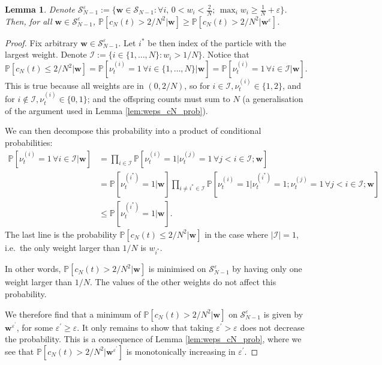 \documentclass{article}
\newtheorem{lemma}{Lemma}
\newcommand{\PR}{\mathbb{P}}
\begin{document}
\begin{lemma}
Denote $\mathcal{S}_{N-1}^\varepsilon := \{ \mathbf{w} \in \mathcal{S}_{N-1} :  \forall i, \, 0 <w_i <\frac{2}{N} ;\, \max_i w_i \geq \frac{1}{N} + \varepsilon \}$.
Then, for all $\mathbf{w} \in \mathcal{S}_{N-1}^\varepsilon$, 
$\PR[c_N(t) > 2/N^2 | \mathbf{w} ] \geq \PR[c_N(t) > 2/N^2 | \mathbf{w}^\varepsilon ]$.
\end{lemma}

\begin{proof}
Fix arbitrary $\mathbf{w} \in \mathcal{S}_{N-1}^\varepsilon$. Let $i^*$ be then index of the particle with the largest weight.
Denote $\mathcal{I} := \{i \in \{1,\dots,N\} : w_i > 1/N \}$.
Notice that 
\begin{equation*}
\PR[ c_N(t) \leq 2/N^2 | \mathbf{w} ] 
= \PR[ \nu_t^{(i)} =1 \,\forall i\in\{1,\dots,N\} | \mathbf{w}] 
= \PR[ \nu_t^{(i)} =1 \,\forall i\in \mathcal{I} | \mathbf{w}] .
\end{equation*}
This is true because all weights are in $(0, 2/N)$, so for $i \in \mathcal{I}, \nu_t^{(i)} \in \{1,2\}$, and for $i \notin \mathcal{I}, \nu_t^{(i)} \in \{0,1\}$; and the offspring counts must sum to $N$ (a generalisation of the argument used in Lemma \ref{lem:weps_cN_prob}).

We can then decompose this probability into a product of conditional probabilities:
\begin{align*}
\PR[ \nu_t^{(i)} =1 \,\forall i\in \mathcal{I} | \mathbf{w}]
&= \prod_{i \in \mathcal{I}} \PR[ \nu_t^{(i)} =1 | \nu_t^{(j)}=1 \,\forall j <i \in \mathcal{I}; \mathbf{w}] \\
&= \PR[\nu_t^{(i^*)} =1 | \mathbf{w}] \prod_{i \neq i^* \in \mathcal{I}} \PR[ \nu_t^{(i)} =1 | \nu_t^{(i^*)}=1; \nu_t^{(j)}=1 \,\forall j <i \in \mathcal{I}; \mathbf{w}] \\
&\leq \PR[\nu_t^{(i^*)} =1 | \mathbf{w}] .
\end{align*}
The last line is the probability $\PR[ c_N(t) \leq 2/N^2 | \mathbf{w} ] $ in the case where $|\mathcal{I}| =1$, i.e.\ the only weight larger than $1/N$ is $w_{i^*}$.

In other words, $\PR[ c_N(t) > 2/N^2 | \mathbf{w} ]$ is minimised on $\mathcal{S}_{N-1}^\varepsilon$ by having only one weight larger than $1/N$. The values of the other weights do not affect this probability. 

We therefore find that a minimum of $\PR[ c_N(t) > 2/N^2 | \mathbf{w} ]$ on $\mathcal{S}_{N-1}^\varepsilon$ is given by $\mathbf{w}^{\varepsilon^\prime}$, for some $\varepsilon^\prime \geq \varepsilon$. 
It only remains to show that taking $\varepsilon^\prime > \varepsilon$ does not decrease the probability. This is a consequence of Lemma \ref{lem:weps_cN_prob}, where we see that $\PR[ c_N(t) > 2/N^2 | \mathbf{w}^{\varepsilon^\prime}]$ is monotonically increasing in $\varepsilon^\prime$.
\end{proof}
\end{document}
